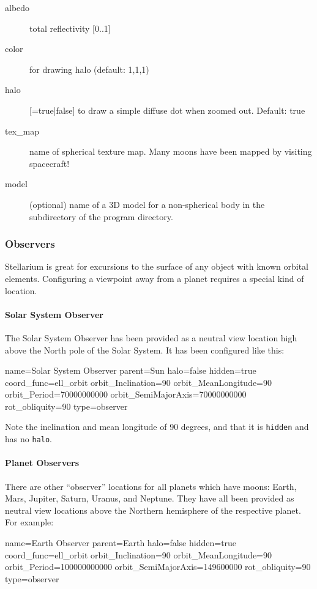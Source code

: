 \begin{description}
  \item[albedo] total reflectivity [0..1]
  \item[color] for drawing halo (default: 1,1,1)
  \item[halo] [=true|false] to draw a simple diffuse dot when zoomed out. Default: true
  \item[tex\_map] name of spherical texture map. Many moons have been mapped by visiting spacecraft!
  \item[model] (optional) name of a 3D model for a non-spherical body in the  subdirectory of the program directory. 
\end{description}



\subsubsection{Observers}
\label{sec:ssystem.ini:Observers}

Stellarium is great for excursions to the surface of any object with
known orbital elements.  Configuring a viewpoint away from a planet
requires a special kind of location.

\paragraph{Solar System Observer}
\label{sec:ssystem.ini:SolarSystemObserver}

The Solar System Observer has
been provided as a neutral view location high above the North pole of
the Solar System. It has been configured like this:
\begin{configfile}
name=Solar System Observer
parent=Sun
halo=false
hidden=true
coord_func=ell_orbit
orbit_Inclination=90
orbit_MeanLongitude=90
orbit_Period=70000000000
orbit_SemiMajorAxis=70000000000
rot_obliquity=90
type=observer
\end{configfile}
Note the inclination and mean longitude of 90 degrees, and that it is \texttt{hidden} and has no \texttt{halo}. 

\paragraph{Planet Observers}
\label{sec:ssystem.ini:PlanetObserver}

There are other ``observer'' locations for all planets  which have moons: Earth, Mars, Jupiter, Saturn, Uranus, and Neptune.
They have all been provided as neutral view locations above the Northern hemisphere of
the respective planet. For example:
\begin{configfile}
name=Earth Observer
parent=Earth
halo=false
hidden=true
coord_func=ell_orbit
orbit_Inclination=90
orbit_MeanLongitude=90
orbit_Period=100000000000
orbit_SemiMajorAxis=149600000
rot_obliquity=90
type=observer
\end{configfile}


